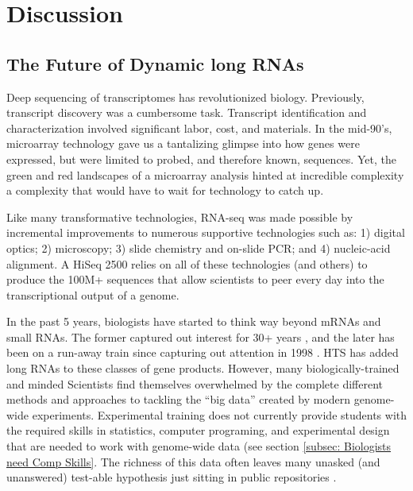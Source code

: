 \chapter{Discussion} \label{Discussion}

\section{The Future of Dynamic long RNAs}

  Deep sequencing of transcriptomes has revolutionized biology. Previously, transcript discovery was a cumbersome task. Transcript identification and characterization involved significant labor, cost, and materials. In the mid-90's, microarray technology \citep{Schena1995a} gave us a tantalizing glimpse into how genes were expressed, but were limited to probed, and therefore known, sequences. Yet, the green and red landscapes of a microarray analysis hinted at incredible complexity \textemdash a complexity that would have to wait for technology to catch up.

  Like many transformative technologies, RNA-seq was made possible by incremental improvements to numerous supportive technologies such as: 1) digital optics; 2) microscopy; 3) slide chemistry and on-slide PCR; and 4) nucleic-acid alignment. A HiSeq 2500 relies on all of these technologies (and others) to produce the 100M+ sequences that allow scientists to peer every day into the transcriptional output of a genome.

  In the past 5 years, biologists have started to think way beyond mRNAs and small RNAs. The former captured out interest for 30+ years \citep{Furuichi1975,Wei1975}, and the later has been on a run-away train since capturing out attention in 1998 \citep{Fire1998}. HTS has added long RNAs to these classes of gene products. However, many biologically-trained and minded Scientists find themselves overwhelmed by the complete different methods and approaches to tackling the ``big data'' created by modern genome-wide experiments. Experimental training does not currently provide students with the required skills in statistics, computer programing, and experimental design that are needed to work with genome-wide data (see section \ref{subsec: Biologists need Comp Skills}. The richness of this data often leaves many unasked (and unanswered) test-able hypothesis just sitting in public repositories \citep{Plocik2013}.

